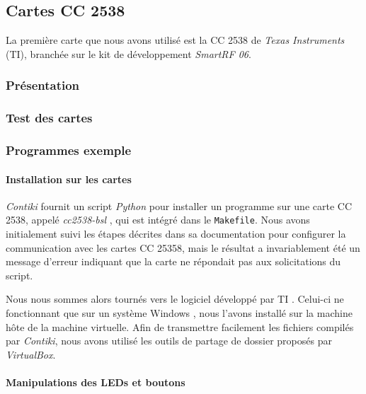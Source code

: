 \subsection{Cartes CC 2538}

La première carte que nous avons utilisé est la CC 2538 de \emph{Texas Instruments} (TI), branchée sur le kit de développement \emph{SmartRF 06}.

\subsubsection{Présentation}


\subsubsection{Test des cartes}


\subsubsection{Programmes exemple}

\paragraph{Installation sur les cartes}

\emph{Contiki} fournit un script \emph{Python} pour installer un programme sur une carte CC 2538, appelé \emph{cc2538-bsl} , qui est intégré dans le \texttt{Makefile}.
Nous avons initialement suivi les étapes décrites dans sa documentation pour configurer la communication avec les cartes CC 25358, mais le résultat a invariablement été un message d’erreur indiquant que la carte ne répondait pas aux solicitations du script.


Nous nous sommes alors tournés vers le logiciel développé par TI \todo[nom].
Celui-ci ne fonctionnant que sur un système Windows , nous l’avons installé sur la machine hôte de la machine virtuelle.
Afin de transmettre facilement les fichiers compilés par \emph{Contiki}, nous avons utilisé les outils de partage de dossier proposés par \emph{VirtualBox}.


\paragraph{Manipulations des LEDs et boutons}

